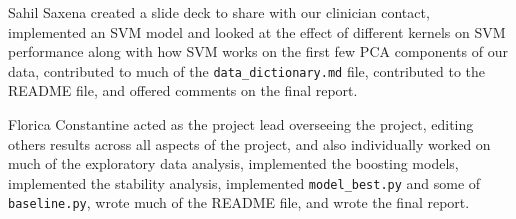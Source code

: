 \documentclass[11pt, letterpaper]{amsart}
\begin{document}
Sahil Saxena created a slide deck to share with our clinician contact, implemented an SVM model and looked at the effect of different kernels on SVM performance along with how SVM works on the first few PCA components of our data, contributed to much of the \texttt{data\_dictionary.md} file, contributed to the README file, and offered comments on the final report.

Florica Constantine acted as the project lead overseeing the project, editing others results across all aspects of the project, and also individually worked on much of the exploratory data analysis, implemented the boosting models, implemented the stability analysis, implemented \texttt{model\_best.py} and some of \texttt{baseline.py}, wrote much of the README file, and wrote the final report.

\printbibliography
\end{document}
